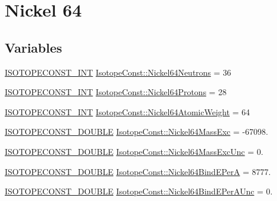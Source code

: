 \hypertarget{group___isotope_const-_nickel-_ni64}{}\section{Nickel 64}
\label{group___isotope_const-_nickel-_ni64}
\subsection*{Variables}
\begin{DoxyCompactItemize}
\item 
\mbox{\hyperlink{group___isotope_const-_macros_ga5f18360b3e99483a35c32d789e62621c}{I\+S\+O\+T\+O\+P\+E\+C\+O\+N\+S\+T\+\_\+\+I\+NT}} \mbox{\hyperlink{group___isotope_const-_nickel-_ni64_ga496d29b647b53cfa1e313702ea62d114}{Isotope\+Const\+::\+Nickel64\+Neutrons}} = 36
\item 
\mbox{\hyperlink{group___isotope_const-_macros_ga5f18360b3e99483a35c32d789e62621c}{I\+S\+O\+T\+O\+P\+E\+C\+O\+N\+S\+T\+\_\+\+I\+NT}} \mbox{\hyperlink{group___isotope_const-_nickel-_ni64_gaa7fc5b064f154171e2461d7bc8cd5001}{Isotope\+Const\+::\+Nickel64\+Protons}} = 28
\item 
\mbox{\hyperlink{group___isotope_const-_macros_ga5f18360b3e99483a35c32d789e62621c}{I\+S\+O\+T\+O\+P\+E\+C\+O\+N\+S\+T\+\_\+\+I\+NT}} \mbox{\hyperlink{group___isotope_const-_nickel-_ni64_ga0fa405f1003e6d1f2fceccee55b8de5f}{Isotope\+Const\+::\+Nickel64\+Atomic\+Weight}} = 64
\item 
\mbox{\hyperlink{group___isotope_const-_macros_ga8f45a7272ce02c0b4c65c44636ed719a}{I\+S\+O\+T\+O\+P\+E\+C\+O\+N\+S\+T\+\_\+\+D\+O\+U\+B\+LE}} \mbox{\hyperlink{group___isotope_const-_nickel-_ni64_gaa3bcaf52f6e7534cb27b7cb7c7974dd4}{Isotope\+Const\+::\+Nickel64\+Mass\+Exc}} = -\/67098.
\item 
\mbox{\hyperlink{group___isotope_const-_macros_ga8f45a7272ce02c0b4c65c44636ed719a}{I\+S\+O\+T\+O\+P\+E\+C\+O\+N\+S\+T\+\_\+\+D\+O\+U\+B\+LE}} \mbox{\hyperlink{group___isotope_const-_nickel-_ni64_ga29a4d7d6b2fab1b2e21822d1b9114910}{Isotope\+Const\+::\+Nickel64\+Mass\+Exc\+Unc}} = 0.
\item 
\mbox{\hyperlink{group___isotope_const-_macros_ga8f45a7272ce02c0b4c65c44636ed719a}{I\+S\+O\+T\+O\+P\+E\+C\+O\+N\+S\+T\+\_\+\+D\+O\+U\+B\+LE}} \mbox{\hyperlink{group___isotope_const-_nickel-_ni64_ga04a15fb26903a6fc5dd95c3240542e28}{Isotope\+Const\+::\+Nickel64\+Bind\+E\+PerA}} = 8777.
\item 
\mbox{\hyperlink{group___isotope_const-_macros_ga8f45a7272ce02c0b4c65c44636ed719a}{I\+S\+O\+T\+O\+P\+E\+C\+O\+N\+S\+T\+\_\+\+D\+O\+U\+B\+LE}} \mbox{\hyperlink{group___isotope_const-_nickel-_ni64_ga8b16e93233d8805cb08302ce254d9f50}{Isotope\+Const\+::\+Nickel64\+Bind\+E\+Per\+A\+Unc}} = 0.

\end{DoxyCompactItemize}
